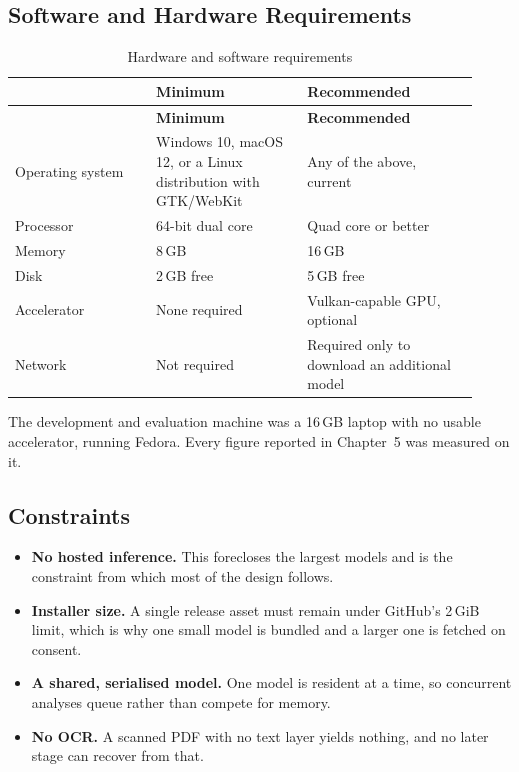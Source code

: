 \documentclass[12pt,a4paper]{report}
\begin{document}
\subsection{Software and Hardware Requirements}

\begin{longtable}{@{}p{0.28\linewidth}p{0.30\linewidth}p{0.34\linewidth}@{}}
\caption{Hardware and software requirements}\label{tab:sysreq}\\
\toprule
 & \textbf{Minimum} & \textbf{Recommended} \\
\midrule
\endfirsthead
\toprule
 & \textbf{Minimum} & \textbf{Recommended} \\
\midrule
\endhead

Operating system & Windows 10, macOS 12, or a Linux distribution with GTK/WebKit
 & Any of the above, current \\
Processor & 64-bit dual core & Quad core or better \\
Memory & 8\,GB & 16\,GB \\
Disk & 2\,GB free & 5\,GB free \\
Accelerator & None required & Vulkan-capable GPU, optional \\
Network & Not required & Required only to download an additional model \\
\bottomrule
\end{longtable}

The development and evaluation machine was a 16\,GB laptop with no usable
accelerator, running Fedora. Every figure reported in Chapter~5 was measured on
it.

\subsection{Constraints}

\begin{itemize}[leftmargin=*]
  \item \textbf{No hosted inference.} This forecloses the largest models and
        is the constraint from which most of the design follows.
  \item \textbf{Installer size.} A single release asset must remain under
        GitHub's 2\,GiB limit, which is why one small model is bundled and a
        larger one is fetched on consent.
  \item \textbf{A shared, serialised model.} One model is resident at a time,
        so concurrent analyses queue rather than compete for memory.
  \item \textbf{No OCR.} A scanned PDF with no text layer yields nothing, and
        no later stage can recover from that.
\end{itemize}
\end{document}
